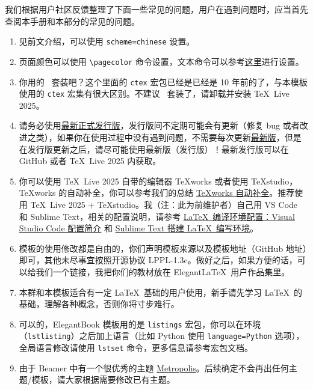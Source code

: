 \documentclass[lang=cn,newtx,10pt,scheme=chinese]{elegantbook}
\begin{document}
我们根据用户社区反馈整理了下面一些常见的问题，用户在遇到问题时，应当首先查阅本手册和本部分的常见的问题。

\begin{enumerate}[itemsep=1.5ex]
  \item {}
    见前文介绍，可以使用 \lstinline{scheme=chinese} 设置。
  \item {}
    页面颜色可以使用 \lstinline{\pagecolor} 命令设置，文本命令可以参考\href{https://tex.stackexchange.com/questions/278544/xcolor-what-is-the-equivalent-of-default-text-color}{这里}进行设置。
  \item {}
    你用的 \CTeX\ 套装吧？这个里面的 \lstinline{ctex} 宏包已经是已经是 10 年前的了，与本模板使用的 \lstinline{ctex} 宏集有很大区别。不建议 \CTeX\ 套装了，请卸载并安装 \TeX~Live 2025。
  \item {}
    请务必使用\href{https://github.com/ElegantLaTeX/ElegantBook/releases}{最新正式发行版}，发行版间不定期可能会有更新（修复 bug 或者改进之类），如果你在使用过程中没有遇到问题，不需要每次更新\href{https://github.com/ElegantLaTeX/ElegantBook/archive/master.zip}{最新版}，但是在发行版更新之后，请尽可能使用最新版（发行版）！最新发行版可以在 GitHub 或者 \TeX~Live 2025 内获取。
  \item {}
    你可以使用 \TeX~Live 2025 自带的编辑器 \TeX works 或者使用 \TeX studio，\TeX works 的自动补全，你可以参考我们的总结 \href{https://github.com/EthanDeng/texworks-autocomplete}{\TeX works 自动补全}。推荐使用 \TeX~Live 2025 + \TeX studio。我（注：此为前维护者）自己用 VS Code 和 Sublime Text，相关的配置说明，请参考 \href{https://github.com/EthanDeng/vscode-latex}{\LaTeX\ 编译环境配置：Visual Studio Code 配置简介} 和 \href{https://github.com/EthanDeng/sublime-text-latex}{Sublime Text 搭建 \LaTeX\ 编写环境}。
  \item {}
    模板的使用修改都是自由的，你们声明模板来源以及模板地址（GitHub 地址）即可，其他未尽事宜按照开源协议 LPPL-1.3c。做好之后，如果方便的话，可以给我们一个链接，我把你们的教材放在 Elegant\LaTeX\ 用户作品集里。
  \item {}
    本群和本模板适合有一定 \LaTeX\ 基础的用户使用，新手请先学习 \LaTeX\ 的基础，理解各种概念，否则你将寸步难行。
  \item {}
    可以的，ElegantBook 模板用的是 \lstinline{listings} 宏包，你可以在环境（\lstinline{lstlisting}）之后加上语言（比如 Python 使用 \lstinline{language=Python} 选项），全局语言修改请使用 \lstinline{lstset} 命令，更多信息请参考宏包文档。
  \item {}
    由于 Beamer 中有一个很优秀的主题 \href{https://github.com/matze/mtheme}{Metropolis}。后续确定不会再出任何主题/模板，请大家根据需要修改已有主题。
\end{enumerate}
\end{document}
